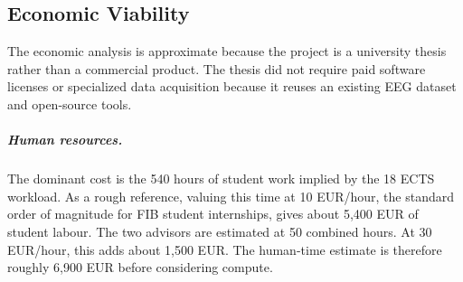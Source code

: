 \documentclass[11pt,a4paper,chapterprefix=false,parskip=false]{scrreprt}
\begin{document}
\begin{appendices}
    \chapter{Economic Viability}
    \label{app:cost}
    The economic analysis is approximate because the project is a university thesis rather than a commercial product. The thesis did not require paid software licenses or specialized data acquisition because it reuses an existing EEG dataset and open-source tools.

    \paragraph{Human resources.}
    The dominant cost is the 540 hours of student work implied by the 18 ECTS workload. As a rough reference, valuing this time at 10 EUR/hour, the standard order of magnitude for FIB student internships, gives about 5,400 EUR of student labour. The two advisors are estimated at 50 combined hours. At 30 EUR/hour, this adds about 1,500 EUR. The human-time estimate is therefore roughly 6,900 EUR before considering compute.


\end{appendices}
\end{document}
